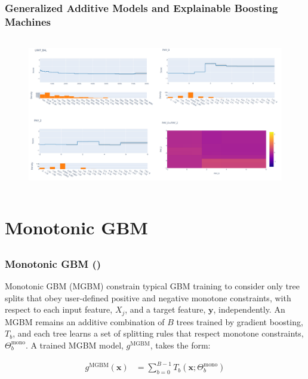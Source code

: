 \documentclass[11pt,aspectratio=169,hyperref={colorlinks}]{beamer}
\begin{document}
	\begin{frame}
	
		\frametitle{Generalized Additive Models and Explainable Boosting Machines}
		
		\begin{figure}[htb]
			\begin{center}
				\includegraphics[height=190pt]{../img/ebm.png}
				\label{fig:ebm}
			\end{center}
		\end{figure}
	
	\end{frame}
	\section{Monotonic GBM}

	\subsection*{}
	
	\begin{frame}
	
		\frametitle{Monotonic GBM (\cite{rml_workflow})}

			Monotonic GBM (MGBM) constrain typical GBM training to consider only tree splits that obey user-defined positive and negative monotone constraints, with respect to each input feature, $X_j$, and a target feature, $\mathbf{y}$, independently. An MGBM remains an additive combination of $B$ trees trained by gradient boosting, $T_b$, and each tree learns a set of splitting rules that respect monotone constraints,  $\Theta^\text{mono}_b$. A trained MGBM model, $g^{\text{MGBM}}$, takes the form:
			
			\begin{equation}
			\begin{aligned}\label{eq:gbm}
			g^{\text{MGBM}}(\mathbf{x}) &= \sum_{b=0}^{B-1} T_b\left(\mathbf{x}; \Theta^\text{mono}_b\right)
			\end{aligned}
			\end{equation}
		
	\end{frame}
\end{document}
